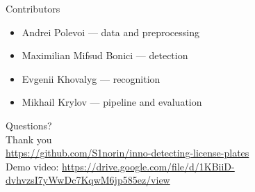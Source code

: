 \documentclass[10pt]{beamer}
\begin{document}
\begin{frame}{Contributors}
\begin{itemize}
  \item Andrei Polevoi --- data and preprocessing
  \item Maximilian Mifsud Bonici --- detection
  \item Evgenii Khovalyg --- recognition
  \item Mikhail Krylov --- pipeline and evaluation
\end{itemize}
\end{frame}

\begin{frame}[plain]
\begin{center}
\vspace*{3cm}
{\LARGE Questions?}\\[1em]
{\large Thank you}\\[1.2em]
{\large \url{https://github.com/S1norin/inno-detecting-license-plates}}\\[0.5em]
{\small Demo video: \url{https://drive.google.com/file/d/1KBiiD-dvhvzsI7yWwDc7KqwM6jp585ez/view}}
\end{center}
\end{frame}
\end{document}
